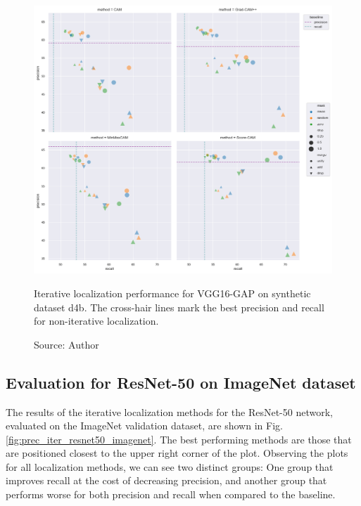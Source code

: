 \begin{figure}[ht]
    \begin{center}       
    \includegraphics[width=1.0\textwidth]{images/fig_iter_vgg16_gap_syn_d4b.png}
    \caption[Iterative localization performance for VGG16-GAP on synthetic dataset d4b]{Iterative localization performance for VGG16-GAP on synthetic dataset d4b. The cross-hair lines mark the best precision and recall for non-iterative localization.}
    \caption*{Source: Author}
    \label{fig:prec_iter_vgg16_gap_syn_d4b}
    \end{center}
\end{figure}

\subsection{Evaluation for ResNet-50 on ImageNet dataset}

The results of the iterative localization methods for the ResNet-50 network, evaluated on the ImageNet validation dataset, are shown in Fig. \ref{fig:prec_iter_resnet50_imagenet}. The best performing methods are those that are positioned closest to the upper right corner of the plot. Observing the plots for all localization methods, we can see two distinct groups: One group that improves recall at the cost of decreasing precision, and another group that performs worse for both precision and recall when compared to the baseline.

